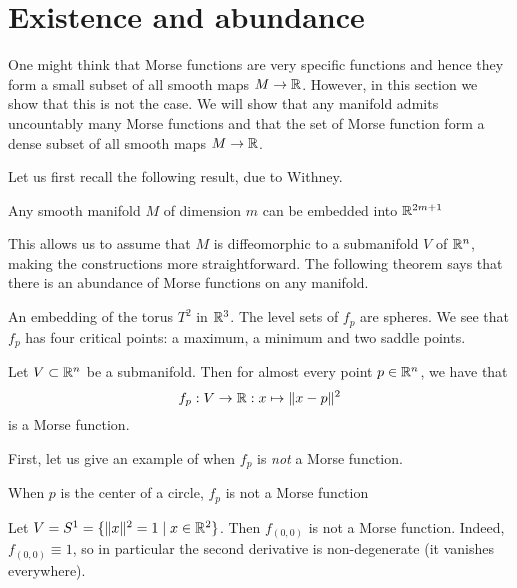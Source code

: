 \section{Existence and abundance}
One might think that Morse functions are very specific functions and hence they form a small subset of all smooth maps $M \to  \mathbb{R}$.
However, in this section we show that this is not the case. We will show that any manifold admits uncountably many Morse functions and that the set of Morse function form a dense subset of all smooth maps $M \to  \mathbb{R}$.

Let us first recall the following result, due to Withney\cite{todo}.
\begin{theorem}
    Any smooth manifold $M$ of dimension $m$ can be embedded into  $\mathbb{R}^{2m+1}$
\end{theorem}
This allows us to assume that $M$ is diffeomorphic to a submanifold $V$ of $\mathbb{R}^{n}$, making the constructions  more straightforward.
The following theorem says that there is an abundance of Morse functions on any manifold.

\begin{marginfigure}
    \centering
    \caption{An embedding of the torus $T^2$ in $\mathbb{R}^3$. The level sets of $f_p$ are spheres. We see that $f_p$ has four critical points: a maximum, a minimum and two saddle points.}
    \label{fig:level-sets-of-distance-function-torus}
\end{marginfigure}

\begin{prop}
    Let $V \subset \mathbb{R}^{n}$ be a submanifold.
    Then for almost every point $p \in \mathbb{R}^{n}$, we have that
    \[
    f_p : V \to \mathbb{R}: x \mapsto  \|x - p\|^2
    \] 
    is a Morse function.
\end{prop}

First, let us give an example of when $f_p$ is \emph{not} a Morse function.

\begin{marginfigure}
    \centering
    \caption{When $p$ is the center of a circle, $f_p$ is not a Morse function}
    \label{fig:example-when-fp-is-not-a-morse-function}
\end{marginfigure}
\begin{eg}
    Let $V = S^1 = \{\|x\|^2 = 1  \mid  x \in \mathbb{R}^2\} $.
    Then $f_{(0, 0)}$ is not a Morse function.
    Indeed, $f_{(0, 0)} \equiv 1$, so in particular the second derivative is non-degenerate (it vanishes everywhere).
\end{eg}


